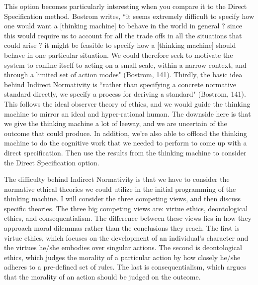 \documentclass[11pt, oneside]{article}
\begin{document}
\par This option becomes particularly interesting when you compare it to the Direct Specification method. Bostrom writes, ``it seems extremely difficult to specify how one would want a [thinking machine] to behave in the world in general ? since this would require us to account for all the trade offs in all the situations that could arise ? it might be feasible to specify how a [thinking machine] should behave in one particular situation. We could therefore seek to motivate the system to confine itself to acting on a small scale, within a narrow context, and through a limited set of action modes" (Bostrom, 141).
Thirdly, the basic idea behind Indirect Normativity is ``rather than specifying a concrete normative standard directly, we specify a process for deriving a standard" (Bostrom, 141). This follows the ideal observer theory of ethics, and we would guide the thinking machine to mirror an ideal and hyper-rational human. The downside here is that we give the thinking machine a lot of leeway, and we are uncertain of the outcome that could produce. In addition, we're also able to offload the thinking machine to do the cognitive work that we needed to perform to come up with a direct specification. Then use the results from the thinking machine to consider the Direct Specification option.
 
\par The difficulty behind Indirect Normativity is that we have to consider the normative ethical theories we could utilize in the initial programming of the thinking machine. I will consider the three competing views, and then discuss specific theories. The three big competing views are: virtue ethics, deontological ethics, and consequentialism. The difference between these views lies in how they approach moral dilemmas rather than the conclusions they reach.
The first is virtue ethics, which focuses on the development of an individual's character and the virtues he/she embodies over singular actions. The second is deontological ethics, which judges the morality of a particular action by how closely he/she adheres to a pre-defined set of rules. The last is consequentialism, which argues that the morality of an action should be judged on the outcome.
 
\end{document}
